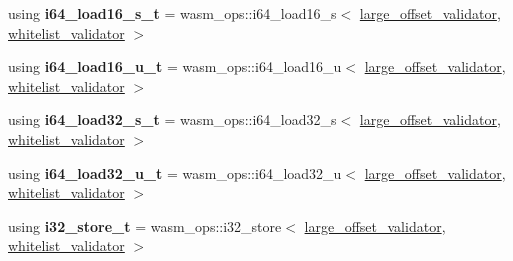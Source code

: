 \begin{DoxyCompactItemize}
using {\bfseries i64\+\_\+load16\+\_\+s\+\_\+t} = wasm\+\_\+ops\+::i64\+\_\+load16\+\_\+s$<$ \mbox{\hyperlink{structaacio_1_1chain_1_1wasm__validations_1_1large__offset__validator}{large\+\_\+offset\+\_\+validator}}, \mbox{\hyperlink{structaacio_1_1chain_1_1wasm__validations_1_1whitelist__validator}{whitelist\+\_\+validator}} $>$
\item 
\mbox{\label{structaacio_1_1chain_1_1wasm__validations_1_1op__constrainers_aac8ec93bd3e054db4e2f12c596776a90}} 
using {\bfseries i64\+\_\+load16\+\_\+u\+\_\+t} = wasm\+\_\+ops\+::i64\+\_\+load16\+\_\+u$<$ \mbox{\hyperlink{structaacio_1_1chain_1_1wasm__validations_1_1large__offset__validator}{large\+\_\+offset\+\_\+validator}}, \mbox{\hyperlink{structaacio_1_1chain_1_1wasm__validations_1_1whitelist__validator}{whitelist\+\_\+validator}} $>$
\item 
\mbox{\label{structaacio_1_1chain_1_1wasm__validations_1_1op__constrainers_aa7d0fcd446032a152b18d7c5c1a0681a}} 
using {\bfseries i64\+\_\+load32\+\_\+s\+\_\+t} = wasm\+\_\+ops\+::i64\+\_\+load32\+\_\+s$<$ \mbox{\hyperlink{structaacio_1_1chain_1_1wasm__validations_1_1large__offset__validator}{large\+\_\+offset\+\_\+validator}}, \mbox{\hyperlink{structaacio_1_1chain_1_1wasm__validations_1_1whitelist__validator}{whitelist\+\_\+validator}} $>$
\item 
\mbox{\label{structaacio_1_1chain_1_1wasm__validations_1_1op__constrainers_ab9ea3a93d94bc7c8969d3777b43f34f0}} 
using {\bfseries i64\+\_\+load32\+\_\+u\+\_\+t} = wasm\+\_\+ops\+::i64\+\_\+load32\+\_\+u$<$ \mbox{\hyperlink{structaacio_1_1chain_1_1wasm__validations_1_1large__offset__validator}{large\+\_\+offset\+\_\+validator}}, \mbox{\hyperlink{structaacio_1_1chain_1_1wasm__validations_1_1whitelist__validator}{whitelist\+\_\+validator}} $>$
\item 
\mbox{\label{structaacio_1_1chain_1_1wasm__validations_1_1op__constrainers_ac6b78c52320f51e4803967f1d5739a40}} 
using {\bfseries i32\+\_\+store\+\_\+t} = wasm\+\_\+ops\+::i32\+\_\+store$<$ \mbox{\hyperlink{structaacio_1_1chain_1_1wasm__validations_1_1large__offset__validator}{large\+\_\+offset\+\_\+validator}}, \mbox{\hyperlink{structaacio_1_1chain_1_1wasm__validations_1_1whitelist__validator}{whitelist\+\_\+validator}} $>$

\end{DoxyCompactItemize}
